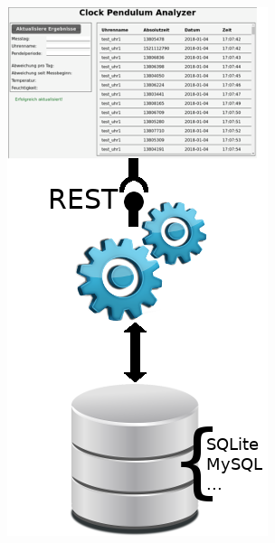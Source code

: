 \begin{frame}
\begin{columns}[c]
\begin{figure}
\begin{overprint}
                \includegraphics[width=.5\textwidth]{3layer_rest.png}
            \end{overprint}
        \end{figure}
    \end{columns}
\end{frame}

